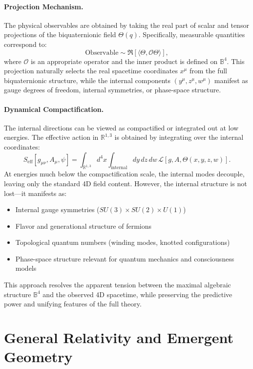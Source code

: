 \documentclass[12pt]{article}
\begin{document}
\paragraph{Projection Mechanism.}
The physical observables are obtained by taking the real part of scalar and tensor projections of the biquaternionic field \( \Theta(q) \). Specifically, measurable quantities correspond to:
\[
\text{Observable} \sim \Re[\langle \Theta, \mathcal{O} \Theta \rangle],
\]
where \( \mathcal{O} \) is an appropriate operator and the inner product is defined on \( \mathbb{B}^4 \). This projection naturally selects the real spacetime coordinates \( x^\mu \) from the full biquaternionic structure, while the internal components \( (y^\mu, z^\mu, w^\mu) \) manifest as gauge degrees of freedom, internal symmetries, or phase-space structure.

\paragraph{Dynamical Compactification.}
The internal directions can be viewed as compactified or integrated out at low energies. The effective action in \( \mathbb{R}^{1,3} \) is obtained by integrating over the internal coordinates:
\[
S_{\text{eff}}[g_{\mu\nu}, A_\mu, \psi] = \int_{\mathbb{R}^{1,3}} d^4x \int_{\text{internal}} dy\, dz\, dw \, \mathcal{L}[g, A, \Theta(x,y,z,w)].
\]
At energies much below the compactification scale, the internal modes decouple, leaving only the standard 4D field content. However, the internal structure is not lost—it manifests as:
\begin{itemize}
  \item Internal gauge symmetries (\( SU(3) \times SU(2) \times U(1) \))
  \item Flavor and generational structure of fermions
  \item Topological quantum numbers (winding modes, knotted configurations)
  \item Phase-space structure relevant for quantum mechanics and consciousness models
\end{itemize}

This approach resolves the apparent tension between the maximal algebraic structure \( \mathbb{B}^4 \) and the observed 4D spacetime, while preserving the predictive power and unifying features of the full theory.

\section{General Relativity and Emergent Geometry}
\end{document}
